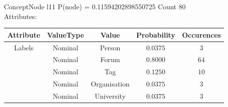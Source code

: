  
ConceptNode l11 \hspace{1cm} P(node) = 0.11594202898550725 \hspace{1cm} Count 80
\\ Attributes: \\ 
 \begin{table}[h] 
  \centering 
 \begin{longtable}{|c|c|c|c|c|} \hline 
Attribute & ValueType & Value & Probability & Occurences \\ \hline 
\multirow{5}{*}{Labels} & Nominal & Person & $0.0375$ & $3$ \\ \cline{2-5} 
 & Nominal & Forum & $0.8000$ & $64$ \\ \cline{2-5} 
 & Nominal & Tag & $0.1250$ & $10$ \\ \cline{2-5} 
 & Nominal & Organisation & $0.0375$ & $3$ \\ \cline{2-5} 
 & Nominal & University & $0.0375$ & $3$ \\ \hline 
\end{longtable}
 \end{table} 

